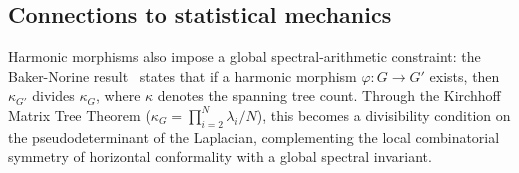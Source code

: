 \documentclass[twocolumn,superscriptaddress,tightenlines,aps,prx,floatfix]{revtex4-2}
\begin{document}
\begin{bibunit}
\subsection{Connections to statistical mechanics}


Harmonic morphisms also impose a global spectral-arithmetic 
constraint: the Baker-Norine result~\cite{baker_Hyperelliptic_graphs} 
states that if a harmonic morphism $\varphi: G \to G'$ exists, then 
$\kappa_{G'}$ divides $\kappa_G$, where $\kappa$ denotes the 
spanning tree count. 
Through the Kirchhoff Matrix Tree Theorem 
($\kappa_G = \prod_{i=2}^N \lambda_i / N$), this becomes a 
divisibility condition on the pseudodeterminant of the Laplacian, 
complementing the local combinatorial symmetry of horizontal 
conformality with a global spectral invariant.


\end{bibunit}
\end{document}
